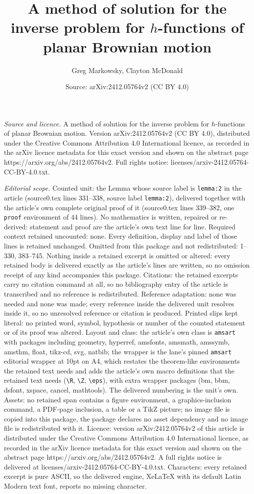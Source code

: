 \documentclass[10pt,a4paper]{amsart}
\title[A method of solution for the inverse problem for $h$-functio]{A method of solution for the inverse problem for $h$-functions of planar Brownian motion}
\author{Greg Markowsky, Clayton McDonald}
\date{Source: arXiv:2412.05764v2 (CC BY 4.0)}
\begin{document}
\maketitle

\noindent\emph{Source and licence.} A method of solution for the inverse problem for $h$-functions of planar Brownian motion. Version arXiv:2412.05764v2 (CC BY 4.0), distributed under the Creative Commons Attribution 4.0 International licence, as recorded in the arXiv licence metadata for this exact version and shown on the abstract page https://arxiv.org/abs/2412.05764v2. Full rights notice: licenses/arxiv-2412.05764-CC-BY-4.0.txt.\par\smallskip

\noindent\textit{Editorial scope.} Counted unit: the Lemma whose source label is \texttt{lemma:2} in the article (source0.tex lines 331--338, source label \texttt{lemma:2}), delivered together with the article's own complete original proof of it (source0.tex lines 339--382, one \texttt{proof} environment of 44 lines). No mathematics is written, repaired or re-derived: statement and proof are the article's own text line for line. Required context retained uncounted: none. Every definition, display and label of those lines is retained unchanged. Omitted from this package and not redistributed: 1--330, 383--745. Nothing inside a retained excerpt is omitted or altered: every retained body is delivered exactly as the article's lines are written, so no omission receipt of any kind accompanies this package. Citations: the retained excerpts carry no citation command at all, so no bibliography entry of the article is transcribed and no reference is redistributed. Reference adaptation: none was needed and none was made; every reference inside the delivered unit resolves inside it, so no unresolved reference or citation is produced. Printed slips kept literal: no printed word, symbol, hypothesis or number of the counted statement or of its proof was altered. Layout and class: the article's own class is \texttt{amsart} with packages including geometry, hyperref, amsfonts, amsmath, amssymb, amsthm, float, tikz-cd, svg, natbib; the wrapper is the lane's pinned \texttt{amsart} editorial wrapper at 10pt on A4, which restates the theorem-like environments the retained text needs and adds the article's own macro definitions that the retained text needs (\texttt{\textbackslash R}, \texttt{\textbackslash Z}, \texttt{\textbackslash eps}), with extra wrapper packages (bm, bbm, dsfont, xspace, cancel, mathtools). The delivered numbering is the unit's own. Assets: no retained span contains a figure environment, a graphics-inclusion command, a PDF-page inclusion, a table or a TikZ picture; no image file is copied into this package, the package declares no asset dependency and no image file is redistributed with it. Licence: version arXiv:2412.05764v2 of this article is distributed under the Creative Commons Attribution 4.0 International licence, as recorded in the arXiv licence metadata for this exact version and shown on the abstract page https://arxiv.org/abs/2412.05764v2. A full rights notice is delivered at licenses/arxiv-2412.05764-CC-BY-4.0.txt. Characters: every retained excerpt is pure ASCII, so the delivered engine, XeLaTeX with its default Latin Modern text font, reports no missing character.
\end{document}

